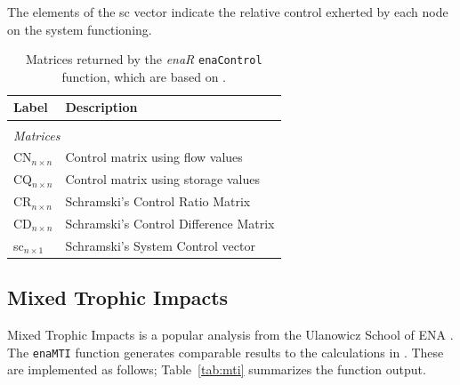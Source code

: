 \documentclass[article]{jss}
\begin{document}
The elements of the sc vector indicate the relative control exherted by each node on the system functioning.

\begin{table}[t]
  \caption{Matrices returned by the \textit{enaR}
    \texttt{enaControl} function, which are based on
    \citep{dame81, patten81, schramski06, schramski07}.} \label{tab:control}
  \center
  \begin{small}
    \begin{tabularx}{\textwidth}{l p{10 cm}}
      \textbf{Label} & \textbf{Description} \\ \hline \\[-1.5ex]
      \multicolumn{2}{l}{\textit{Matrices}} \\[1ex]
      CN$_{n \times n}$ & Control matrix using flow values \\                       %
      CQ$_{n \times n}$ & Control matrix using storage values \\
      CR$_{n \times n}$ & Schramski's Control Ratio Matrix  \\            %
      CD$_{n \times n}$ & Schramski's Control Difference Matrix \\  %
      sc$_{n \times 1}$ & Schramski's System Control vector \\ \hline %
\end{tabularx}
\end{small}
\end{table}


\subsection{Mixed Trophic Impacts}
Mixed Trophic Impacts is a popular analysis from the Ulanowicz School
of ENA \citep{ulanowicz90}.  The \texttt{enaMTI} function generates
comparable results to the calculations in \citet{ulanowicz90}.  These
are implemented as follows; Table~\ref{tab:mti} summarizes the
function output.
\end{document}
